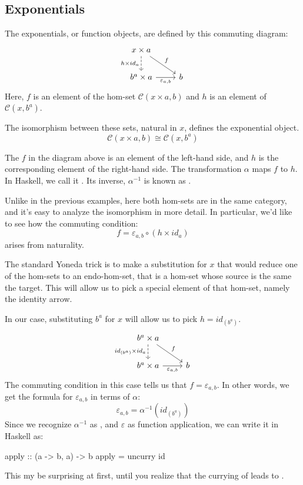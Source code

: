 \documentclass[DaoFP]{subfiles}
\begin{document}
\subsection{Exponentials}

The exponentials, or function objects, are defined by this commuting diagram:
\[
 \begin{tikzcd}
 x \times a
 \arrow[d, dashed, "h \times id_a"']
 \arrow[rd, "f"]
 \\
 b^a \times a
 \arrow[r, "\varepsilon_{a, b}"']
& b
 \end{tikzcd}
\]
Here, $f$ is an element of the hom-set $\mathcal{C}(x \times a, b)$ and $h$ is an element of $\mathcal{C}(x, b^a)$. 

The isomorphism between these sets, natural in $x$, defines the exponential object. 
\[\mathcal{C}(x \times a, b) \cong \mathcal{C}(x, b^a)\]

The $f$ in the diagram above is an element of the left-hand side, and $h$ is the corresponding element of the right-hand side. The transformation $\alpha$ maps $f$ to $h$. In Haskell, we call it . Its inverse, $\alpha^{-1}$ is known as .

Unlike in the previous examples, here both hom-sets are in the same category, and it's easy to analyze the isomorphism in more detail. In particular, we'd like to see how the commuting condition:
\[  f = \varepsilon_{a, b} \circ (h \times id_a) \]
arises from naturality.

The standard Yoneda trick is to make a substitution for $x$ that would reduce one of the hom-sets to an endo-hom-set, that is a hom-set whose source is the same the target. This will allow us to pick a special element of that hom-set, namely the identity arrow.

In our case, substituting $b^a$ for $x$ will allow us to pick $h = id_{(b^a)}$.
\[
 \begin{tikzcd}
 b^a \times a
 \arrow[d, dashed, "id_{(b^a)} \times id_a"']
 \arrow[rd, "f"]
 \\
 b^a \times a
 \arrow[r, "\varepsilon_{a, b}"']
& b
 \end{tikzcd}
\]
The commuting condition in this case tells us that $f = \varepsilon_{a, b}$. In other words, we get the formula for $\varepsilon_{a, b}$ in terms of $\alpha$:
\[ \varepsilon_{a, b} = \alpha^{-1} (id_{(b^a)}) \]
Since we recognize $\alpha^{-1}$ as , and $\varepsilon$ as function application, we can write it in Haskell as:
\begin{haskell}
apply :: (a -> b, a) -> b
apply = uncurry id
\end{haskell}
This my be surprising at first, until you realize that the currying of  leads to .
\end{document}

